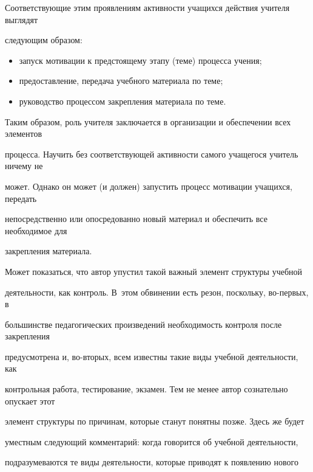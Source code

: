 Соответствующие этим проявлениям активности учащихся действия учителя выглядят 


следующим образом:


\begin{itemize}


\item запуск мотивации к предстоящему этапу (теме) процесса учения;\\[-15pt]


\item предоставление, передача учебного материала по теме;\\[-15pt]


\item руководство процессом закрепления материала по теме.


\end{itemize}





Таким образом, роль учителя заключается в организации и обеспечении всех элементов 


процесса. Научить без соответствующей активности самого учащегося учитель ничему не 


может. Однако он может (и должен) запустить процесс мотивации учащихся, передать 


непосредственно или опосредованно новый материал и обеспечить все необходимое для 


закрепления материала.





Может показаться, что автор упустил такой важный элемент структуры учебной 


деятельности, как контроль. В~этом обвинении есть резон, поскольку, во-пер\-вых, в 


большинстве педагогических произведений необходимость контроля после закрепления 


предусмотрена и, во-вто\-рых, всем известны такие виды учебной деятельности, как 


контрольная работа, тестирование, экзамен. Тем не менее автор сознательно опускает этот 


элемент структуры по причинам, которые станут понятны позже. Здесь же будет 


уместным следующий комментарий: когда говорится об учебной деятельности, 


подразумеваются те виды деятельности, которые приводят к появлению нового 


